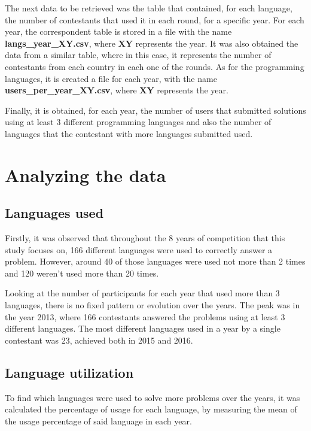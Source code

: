 \documentclass{article}
\begin{document}
\begin{multicols*}{2}
The next data to be retrieved was the table that contained, for each language, the number of contestants that used it in each round, for a specific year. For each year, the correspondent table is stored in a file with the name \textbf{langs\_year\_XY.csv}, where \textbf{XY} represents the year.
It was also obtained the data from a similar table, where in this case, it represents the number of contestants from each country in each one of the rounds. As for the programming languages, it is created a file for each year, with the name \textbf{users\_per\_year\_XY.csv}, where \textbf{XY} represents the year.


Finally, it is obtained, for each year, the number of users that submitted solutions using at least 3 different programming languages and also the number of languages that the contestant with more languages submitted used.

\section{Analyzing the data}

\subsection{Languages used}

Firstly, it was observed that throughout the 8 years of competition that this study focuses on, 166 different languages were used to correctly answer a problem. However, around 40 of those languages were used not more than 2 times and 120 weren't used more than 20 times.

Looking at the number of participants for each year that used more than 3 languages, there is no fixed pattern or evolution over the years. The peak was in the year 2013, where 166 contestants answered the problems using at least 3 different languages. The most different languages used in a year by a single contestant was 23, achieved both in 2015 and 2016.



\subsection{Language utilization}

To find which languages were used to solve more problems over the years, it was calculated the percentage of usage for each language, by measuring the mean of the usage percentage of said language in each year.


\end{multicols*}
\end{document}
